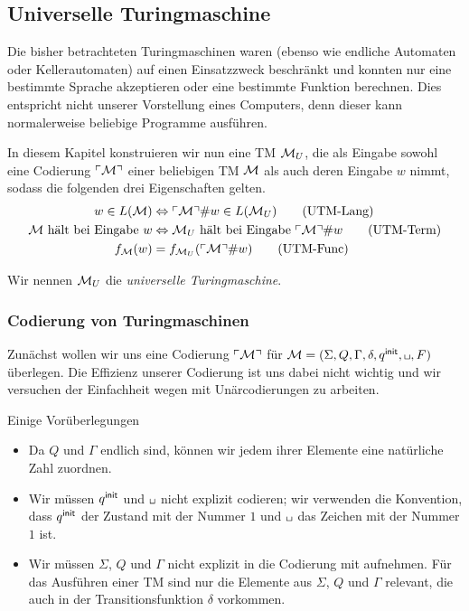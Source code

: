 \subsection{Universelle Turingmaschine}
Die bisher betrachteten Turingmaschinen waren (ebenso wie endliche Automaten oder Kellerautomaten) 
auf einen Einsatzzweck beschränkt und konnten nur eine bestimmte Sprache akzeptieren oder eine bestimmte Funktion berechnen.
Dies entspricht nicht unserer Vorstellung eines Computers, denn dieser kann normalerweise beliebige Programme ausführen.

In diesem Kapitel konstruieren wir nun eine \ac{TM} $\mathcal{M}_U$, die als Eingabe sowohl
eine Codierung $\ulcorner \mathcal{M} \urcorner$ einer beliebigen \ac{TM} $\mathcal{M}$ als auch deren Eingabe $w$ nimmt, sodass die folgenden drei Eigenschaften gelten.
\begin{align}
	\label{Mu-eq-lang} w\in L(\mathcal{M}) &\Leftrightarrow \ulcorner \mathcal{M} \urcorner\#w \in L(\mathcal{M}_U)\tag{UTM-Lang}\\
	\label{Mu-eq-term} \text{$\mathcal{M}$ hält bei Eingabe $w$} &\Leftrightarrow \text{$\mathcal{M}_U$ hält bei Eingabe $\ulcorner \mathcal{M} \urcorner\#w$}\tag{UTM-Term}\\
	\label{Mu-eq-func} \text{$f_{\mathcal{M}}(w)$} &= \text{$f_{\mathcal{M}_U}(\ulcorner \mathcal{M} \urcorner\#w)$}\tag{UTM-Func}
\end{align}

Wir nennen $\mathcal{M}_U$ die \emph{universelle Turingmaschine}.

\subsubsection{Codierung von Turingmaschinen}

Zunächst wollen wir uns eine Codierung $\ulcorner \mathcal{M} \urcorner$ für $\mathcal{\M}=(\Sigma, Q, \Gamma, \delta, \qinit, \blank, F)$ überlegen.
Die Effizienz unserer Codierung ist uns dabei nicht wichtig und wir versuchen der Einfachheit wegen mit Unärcodierungen zu arbeiten.

Einige Vorüberlegungen
\begin{itemize}
 \item Da $Q$ und $\Gamma$ endlich sind, können wir jedem ihrer Elemente eine natürliche Zahl zuordnen.
 \item Wir müssen $q^\mathsf{init}$ und $\blank$ nicht explizit codieren; wir verwenden die Konvention,
 dass $q^\mathsf{init}$ der Zustand mit der Nummer $1$ und $\blank$ das Zeichen mit der Nummer $1$ ist.
 \item Wir müssen $\Sigma$, $Q$ und $\Gamma$ nicht explizit in die Codierung mit aufnehmen.
 Für das Ausführen einer \ac{TM} sind nur die Elemente aus $\Sigma$, $Q$ und $\Gamma$ relevant, die auch in der Transitionsfunktion $\delta$ vorkommen.
\end{itemize}

